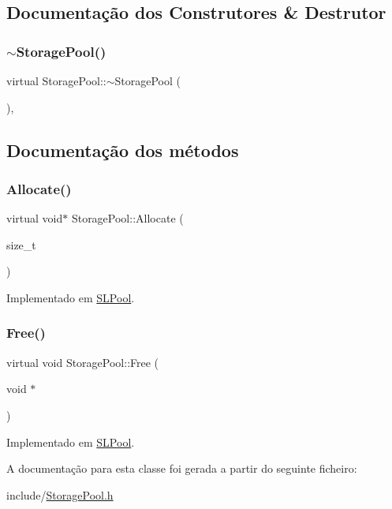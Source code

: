 \subsection{Documentação dos Construtores \& Destrutor}
\mbox{\label{classStoragePool_af762401e53c754fccb49703579bd3b31}} 
\subsubsection{\texorpdfstring{$\sim$\+Storage\+Pool()}{~StoragePool()}}
{\footnotesize\ttfamily virtual Storage\+Pool\+::$\sim$\+Storage\+Pool (\begin{DoxyParamCaption}{ }\end{DoxyParamCaption})\hspace{0.3cm}{\ttfamily [inline]}, {\ttfamily [virtual]}}



\subsection{Documentação dos métodos}
\mbox{\label{classStoragePool_a123a07b2fff40000102b401d7d1b5d5a}} 
\subsubsection{\texorpdfstring{Allocate()}{Allocate()}}
{\footnotesize\ttfamily virtual void$\ast$ Storage\+Pool\+::\+Allocate (\begin{DoxyParamCaption}\item[{size\+\_\+t}]{ }\end{DoxyParamCaption})\hspace{0.3cm}{\ttfamily [pure virtual]}}



Implementado em \hyperlink{classSLPool_aaf054ceb8fa1b8e659f656f04a07dc84}{S\+L\+Pool}.

\mbox{\label{classStoragePool_a2120a75c4562735372d089685828b8df}} 
\subsubsection{\texorpdfstring{Free()}{Free()}}
{\footnotesize\ttfamily virtual void Storage\+Pool\+::\+Free (\begin{DoxyParamCaption}\item[{void $\ast$}]{ }\end{DoxyParamCaption})\hspace{0.3cm}{\ttfamily [pure virtual]}}



Implementado em \hyperlink{classSLPool_aed31c75c4a2d56acd2f845dda2c5b1ad}{S\+L\+Pool}.



A documentação para esta classe foi gerada a partir do seguinte ficheiro\+:\begin{DoxyCompactItemize}
\item 
include/\hyperlink{StoragePool_8h}{Storage\+Pool.\+h}\end{DoxyCompactItemize}
